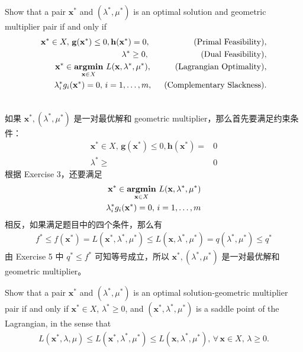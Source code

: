 \documentclass[11pt,letter,notitlepage]{article}
\DeclareMathOperator*{\argmin}{\bf argmin}
\begin{document}
\newpage
\begin{exercise}
	Show that a pair $\mathbf{x}^*$ and $(\lambda^*,\mu^*)$ is an optimal solution and geometric multiplier pair if and only if
	\begin{align}\label{cond:primal-feasibility}
		\mathbf{x}^*\in X,\,\mathbf{g}(\mathbf{x}^*)\leq0,\mathbf{h}(\mathbf{x}^*)=0,\hspace{18.5mm}(\mbox{\textup{Primal Feasibility}}),&\\ \label{cond:dual-feasibility}
		\lambda^*\geq0,\hspace{22mm}(\mbox{\textup{Dual Feasibility}}),&\\ \label{cond:lagrangian-optimality}
		\mathbf{x}^*\in\argmin_{\mathbf{x}\in X}\,L(\mathbf{x},\lambda^*,\mu^*),\hspace{10mm}(\mbox{\textup{Lagrangian Optimality}}),&\\ \label{cond:complementary-slackness}
		\lambda^*_ig_i(\mathbf{x}^*)=0,\,i=1,\ldots,m,\hspace{5mm}(\mbox{\textup{Complementary Slackness}}).&
	\end{align}
\end{exercise}

\begin{solution}
	\heiti
	\ \\
	如果 $\mathbf{x}^*, (\lambda^*,\mu^*)$ 是一对最优解和 geometric multiplier，那么首先要满足约束条件：
	\begin{align*}
		\mathbf{x}^*\in X,\,\mathbf{g}(\mathbf{x}^*)\leq0,\mathbf{h}(\mathbf{x}^*)=& 0\\
		\lambda^*\geq& 0
	\end{align*}
	根据 Exercise 3，还要满足
	\begin{align*}
		\mathbf{x}^*\in\argmin_{\mathbf{x}\in X}\,L(\mathbf{x},\lambda^*,\mu^*)\\
		\lambda^*_ig_i(\mathbf{x}^*)=0,\,i=1,\ldots,m
	\end{align*}
	相反，如果满足题目中的四个条件，那么有
	\begin{align*}
		f^* \leqslant f(\mathbf{x}^*) = L(\mathbf{x}^*,\lambda^*,\mu^*) \leqslant L(\mathbf{x},\lambda^*,\mu^*) = q(\lambda^*,\mu^*) \leqslant q^*
	\end{align*}
	由 Exercise 5 中 $q^* \leqslant f^*$ 可知等号成立，所以 $\mathbf{x}^*, (\lambda^*,\mu^*)$ 是一对最优解和 geometric multiplier。
\end{solution}

\newpage
\begin{exercise}
	 Show that a pair $\mathbf{x}^*$ and $(\lambda^*,\mu^*)$ is an optimal solution-geometric multiplier pair if and only if $\mathbf{x}^*\in X$, $\lambda^*\geq0$, and $(\mathbf{x}^*,\lambda^*,\mu^*)$ is a saddle point of the Lagrangian, in the sense that
	\begin{align}\label{cond:saddle-Lagrangian}
		L(\mathbf{x}^*,\lambda,\mu)\leq L(\mathbf{x}^*,\lambda^*,\mu^*)\leq L(\mathbf{x},\lambda^*,\mu^*),\,\forall\,\mathbf{x}\in X,\,\lambda\geq0.
	\end{align}
\end{exercise}
\end{document}
